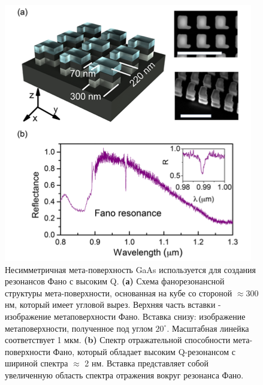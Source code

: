 \begin{figure}[h!]
    \centering
	\includegraphics[width=0.5\linewidth]{images/fig6.png}
	\caption{Несимметричная мета-поверхность GaAs используется для создания резонансов Фано с высоким Q. \textbf{(а) }Схема фанорезонансной структуры мета-поверхности, основанная на кубе со стороной $\approx 300$ нм, который имеет угловой вырез. Верхняя часть вставки - изображение метаповерхности Фано. Вставка снизу: изображение метаповерхности, полученное под углом $20^\circ$. Масштабная линейка соответствует 1 мкм. \textbf{(b)} Спектр отражательной способности мета-поверхности Фано, который обладает высоким Q-резонансом с шириной спектра $\approx$ 2 нм. Вставка представляет собой увеличенную область спектра отражения вокруг резонанса Фано. \cite{vabishchevich2018enhanced}}
	\label{nonliner:matasurf}
\end{figure}

